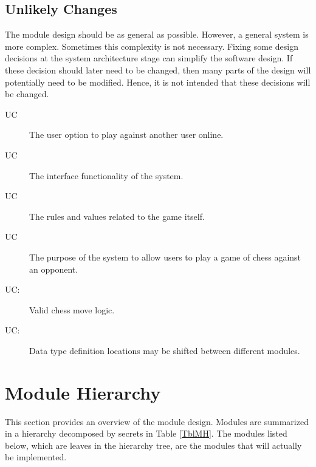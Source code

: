 \documentclass[12pt, titlepage]{article}
\newcounter{ucnum}
\newcommand{\uctheucnum}{UC\theucnum}
\begin{document}
\subsection{Unlikely Changes} \label{SecUchange}

The module design should be as general as possible. However, a general system is
more complex. Sometimes this complexity is not necessary. Fixing some design
decisions at the system architecture stage can simplify the software design. If
these decision should later need to be changed, then many parts of the design
will potentially need to be modified. Hence, it is not intended that these
decisions will be changed.

\begin{description}
  \item[ \uctheucnum] The user option to play against another user online.
  \item[ \uctheucnum] The interface functionality of the system.
  \item[ \uctheucnum] The rules and values related to the game itself.
  \item[ \uctheucnum] The purpose of the system to allow users to play a game of chess against an opponent.
\item[ \uctheucnum \label{ucVML}:] Valid chess move logic.
\item[ \uctheucnum \label{ucDTD}:] Data type definition locations may be shifted between different modules.
\end{description}

\section{Module Hierarchy} \label{SecMH}

This section provides an overview of the module design. Modules are summarized
in a hierarchy decomposed by secrets in Table \ref{TblMH}. The modules listed
below, which are leaves in the hierarchy tree, are the modules that will
actually be implemented.
\end{document}
